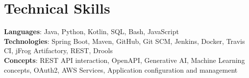 \section{Technical Skills}
    \begin{itemize}[leftmargin=0.15in, label={}]
	\small{\item{
		\textbf{Languages}{: Java, Python, Kotlin, SQL, Bash, JavaScript} \\
		\textbf{Technologies}{: Spring Boot, Maven, GitHub, Git SCM, Jenkins, Docker, Travis CI, jFrog Artifactory, REST, Drools} \\
		\textbf{Concepts}{: REST API interaction, OpenAPI, Generative AI, Machine Learning concepts, OAuth2, AWS Services, Application configuration and management}
	}}
    \end{itemize}